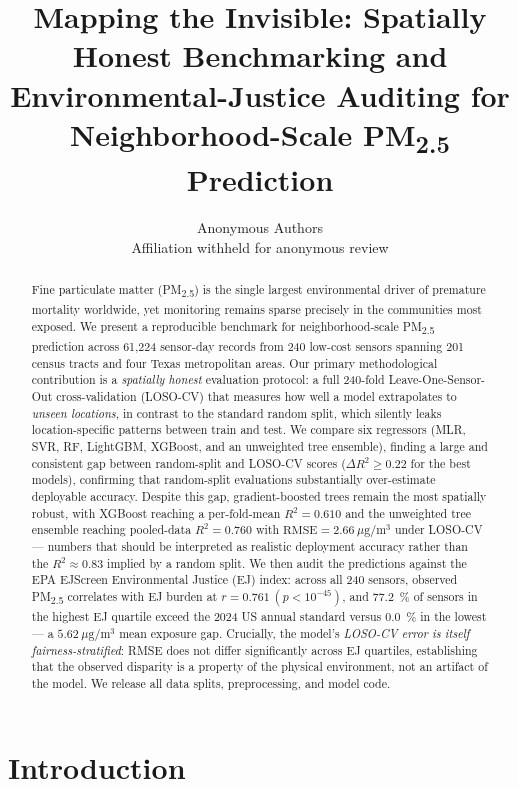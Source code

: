 \documentclass{article}
\title{Mapping the Invisible: Spatially Honest Benchmarking and\\
  Environmental-Justice Auditing for Neighborhood-Scale PM\textsubscript{2.5} Prediction}
\author{%
  Anonymous Authors \\
  Affiliation withheld for anonymous review
}
\begin{document}
\maketitle

\begin{abstract}
Fine particulate matter (PM\textsubscript{2.5}) is the single largest environmental driver of premature mortality worldwide, yet monitoring remains sparse precisely in the communities most exposed. We present a reproducible benchmark for neighborhood-scale PM\textsubscript{2.5} prediction across 61{,}224 sensor-day records from 240 low-cost sensors spanning 201 census tracts and four Texas metropolitan areas. Our primary methodological contribution is a \emph{spatially honest} evaluation protocol: a full 240-fold Leave-One-Sensor-Out cross-validation (LOSO-CV) that measures how well a model extrapolates to \emph{unseen locations}, in contrast to the standard random split, which silently leaks location-specific patterns between train and test. We compare six regressors (MLR, SVR, RF, LightGBM, XGBoost, and an unweighted tree ensemble), finding a large and consistent gap between random-split and LOSO-CV scores ($\Delta R^2 \geq 0.22$ for the best models), confirming that random-split evaluations substantially over-estimate deployable accuracy. Despite this gap, gradient-boosted trees remain the most spatially robust, with XGBoost reaching a per-fold-mean $R^2 = 0.610$ and the unweighted tree ensemble reaching pooled-data $R^2 = 0.760$ with $\mathrm{RMSE} = 2.66~\mu\mathrm{g}/\mathrm{m}^3$ under LOSO-CV --- numbers that should be interpreted as realistic deployment accuracy rather than the $R^2 \approx 0.83$ implied by a random split. We then audit the predictions against the EPA EJScreen Environmental Justice (EJ) index: across all 240 sensors, observed PM\textsubscript{2.5} correlates with EJ burden at $r = 0.761~(p < 10^{-45})$, and \SI{77.2}{\percent} of sensors in the highest EJ quartile exceed the 2024 US annual standard versus \SI{0.0}{\percent} in the lowest --- a $5.62~\mu\mathrm{g}/\mathrm{m}^3$ mean exposure gap. Crucially, the model's \emph{LOSO-CV error is itself fairness-stratified}: RMSE does not differ significantly across EJ quartiles, establishing that the observed disparity is a property of the physical environment, not an artifact of the model. We release all data splits, preprocessing, and model code.
\end{abstract}

\section{Introduction}
\end{document}
